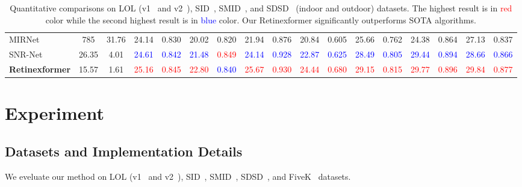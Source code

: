 \documentclass[10pt,twocolumn,letterpaper]{article}
\begin{document}
\begin{table*}[t]
{\begin{tabular}{l|cc|cc|cc|cc|cc|cc|cc|cc}
			MIRNet~\cite{mirnet}   &785 &31.76    &24.14   &0.830  &20.02   &0.820  &21.94  &0.876   &20.84 &0.605   &25.66 &0.762 &24.38  &0.864 &27.13 &0.837 \\    
			SNR-Net~\cite{snr_net}   &26.35   &4.01  &\textcolor{blue}{24.61} &\textcolor{blue}{0.842}  &\textcolor{blue}{21.48}  &\textcolor{red}{0.849}  &\textcolor{blue}{24.14} &\textcolor{blue}{0.928}  &\textcolor{blue}{22.87} &\textcolor{blue}{0.625} &\textcolor{blue}{28.49} &\textcolor{blue}{0.805} &\textcolor{blue}{29.44} &\textcolor{blue}{0.894} &\textcolor{blue}{28.66} &\textcolor{blue}{0.866} \\ \midrule[0.15em]
			\textbf{Retinexformer}      &15.57  &1.61   &\textcolor{red}{25.16}      &\textcolor{red}{0.845}        &\textcolor{red}{22.80}      &\textcolor{blue}{0.840}    &\textcolor{red}{25.67} &\textcolor{red}{0.930} &\textcolor{red}{24.44} &\textcolor{red}{0.680} &\textcolor{red}{29.15} &\textcolor{red}{0.815}  &\textcolor{red}{29.77} &\textcolor{red}{0.896} &\textcolor{red}{29.84} &\textcolor{red}{0.877} \\ \bottomrule[0.15em]
	\end{tabular}}
	\vspace{2mm}
	\caption{Quantitative comparisons on LOL (v1~\cite{retinex_net} and v2~\cite{lol_v2}), SID~\cite{sid}, SMID~\cite{smid}, and SDSD~\cite{sdsd} (indoor and outdoor) datasets. The highest result is in \textcolor{red}{red} color while the second highest result is in \textcolor{blue}{blue} color. Our Retinexformer significantly outperforms SOTA algorithms. }\label{tab:quantitative}
	\vspace{-3mm}
\end{table*}

\section{Experiment}
\vspace{-1mm}
\subsection{Datasets and Implementation Details}
\vspace{-1mm}
We eveluate our method on LOL (v1~\cite{retinex_net} and v2~\cite{lol_v2}), SID~\cite{sid}, SMID~\cite{smid},  SDSD~\cite{sdsd}, and FiveK~\cite{fivek} datasets.
\end{document}
